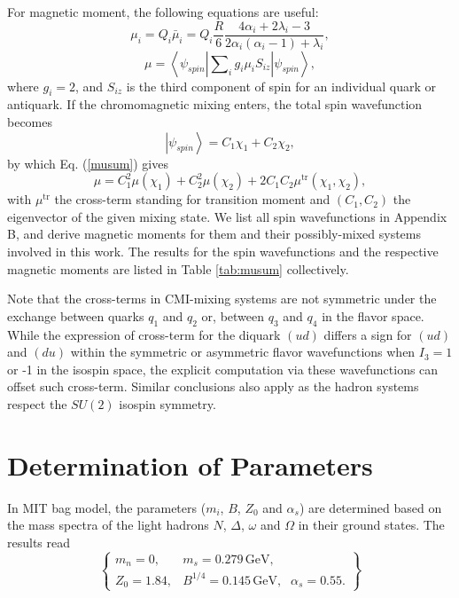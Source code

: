 \documentclass[12pt,prd,onecolumn,floatfix,nofootinbib]{revtex4}
\begin{document}
For magnetic moment, the following equations \cite%
{DeGrand:1975cf,Wang:2016dzu} are useful:
\begin{equation}
\mu _{i}=Q_{i}\bar{\mu}_{i}=Q_{i}\frac{R}{6}\frac{4\alpha _{i}+2\lambda
_{i}-3}{2\alpha _{i}\left( \alpha _{i}-1\right) +\lambda _{i}},  \label{mui}
\end{equation}%
\begin{equation}
\mu =\left\langle \psi _{spin}\left\vert \sum\nolimits_{i}g_{i}\mu
_{i}S_{iz}\right\vert \psi _{spin}\right\rangle ,  \label{musum}
\end{equation}%
where $g_{i}=2$, and $S_{iz}$ is the third component of spin for an
individual quark or antiquark. If the chromomagnetic mixing enters, the
total spin wavefunction becomes
\begin{equation}
\left\vert \psi _{spin}\right\rangle =C_{1}\chi _{1}+C_{2}\chi _{2},
\end{equation}%
by which Eq. (\ref{musum}) gives
\begin{equation}
\mu =C_{1}^{2}\mu \left( \chi _{1}\right) +C_{2}^{2}\mu \left( \chi
_{2}\right) +2C_{1}C_{2}\mu ^{\mathrm{tr}}\left( \chi _{1},\chi _{2}\right) ,
\end{equation}%
with $\mu ^{\mathrm{tr}}$ the cross-term standing for transition moment \cite%
{Bernotas:2012nz} and $(C_{1},C_{2})$ the eigenvector of the given mixing
state. We list all spin wavefunctions in Appendix B, and derive magnetic
moments for them and their possibly-mixed systems involved in this work. The
results for the spin wavefunctions and the respective magnetic moments are
listed in Table \ref{tab:musum} collectively.

Note that the cross-terms in CMI-mixing systems are not symmetric under the
exchange between quarks $q_{1}$ and $q_{2}$ or, between $q_{3}$ and $q_{4}$
in the flavor space. While the expression of cross-term for the diquark $%
(ud) $ differs a sign for $(ud)$ and $(du)$ within the symmetric or
asymmetric flavor wavefunctions when $I_{3}=1$ or -1 in the isospin space,
the explicit computation via these wavefunctions can offset such cross-term. 
Similar conclusions also apply as the hadron systems respect the $SU(2)$ 
isospin symmetry.

\section{Determination of Parameters}

\label{Parameters} In MIT bag model, the parameters ($m_{i}$, $B$, $Z_{0}$
and $\alpha _{s}$) are determined based on the mass spectra of the light
hadrons $N$, $\Delta $, $\omega $ and $\Omega $ in their ground states. The
results read \cite{DeGrand:1975cf}
\begin{equation}
\begin{Bmatrix}
m_{n}=0, & m_{s}=0.279\,\text{GeV,} &  \\
Z_{0}=1.84, & B^{1/4}=0.145\,\text{GeV,} & \alpha _{s}=0.55.%
\end{Bmatrix}
\label{oripar}
\end{equation}
\end{document}
